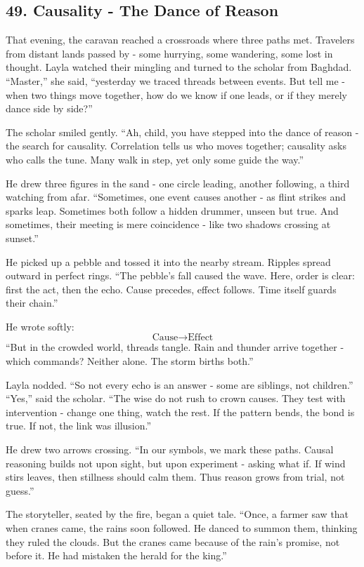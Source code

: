\documentclass[
  letterpaper,
  DIV=11,
  numbers=noendperiod]{scrreprt}
\begin{document}
\subsection{49. Causality - The Dance of
Reason}\label{causality---the-dance-of-reason}

That evening, the caravan reached a crossroads where three paths met.
Travelers from distant lands passed by - some hurrying, some wandering,
some lost in thought. Layla watched their mingling and turned to the
scholar from Baghdad. ``Master,'' she said, ``yesterday we traced
threads between events. But tell me - when two things move together, how
do we know if one leads, or if they merely dance side by side?''

The scholar smiled gently. ``Ah, child, you have stepped into the dance
of reason - the search for causality. Correlation tells us who moves
together; causality asks who calls the tune. Many walk in step, yet only
some guide the way.''

He drew three figures in the sand - one circle leading, another
following, a third watching from afar. ``Sometimes, one event causes
another - as flint strikes and sparks leap. Sometimes both follow a
hidden drummer, unseen but true. And sometimes, their meeting is mere
coincidence - like two shadows crossing at sunset.''

He picked up a pebble and tossed it into the nearby stream. Ripples
spread outward in perfect rings. ``The pebble's fall caused the wave.
Here, order is clear: first the act, then the echo. Cause precedes,
effect follows. Time itself guards their chain.''

He wrote softly: \[
\text{Cause} \to \text{Effect}
\] ``But in the crowded world, threads tangle. Rain and thunder arrive
together - which commands? Neither alone. The storm births both.''

Layla nodded. ``So not every echo is an answer - some are siblings, not
children.'' ``Yes,'' said the scholar. ``The wise do not rush to crown
causes. They test with intervention - change one thing, watch the rest.
If the pattern bends, the bond is true. If not, the link was illusion.''

He drew two arrows crossing. ``In our symbols, we mark these paths.
Causal reasoning builds not upon sight, but upon experiment - asking
what if. If wind stirs leaves, then stillness should calm them. Thus
reason grows from trial, not guess.''

The storyteller, seated by the fire, began a quiet tale. ``Once, a
farmer saw that when cranes came, the rains soon followed. He danced to
summon them, thinking they ruled the clouds. But the cranes came because
of the rain's promise, not before it. He had mistaken the herald for the
king.''
\end{document}
